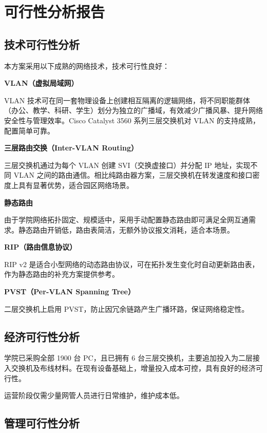 \documentclass[12pt,a4paper]{ctexart}
\begin{document}
\section{可行性分析报告}

\subsection{技术可行性分析}

本方案采用以下成熟的网络技术，技术可行性良好：

\textbf{VLAN（虚拟局域网）}

VLAN 技术可在同一套物理设备上创建相互隔离的逻辑网络，将不同职能群体（办公、教学、科研、学生）划分为独立的广播域，有效减少广播风暴、提升网络安全性与管理效率。Cisco Catalyst 3560 系列三层交换机对 VLAN 的支持成熟，配置简单可靠。

\textbf{三层路由交换（Inter-VLAN Routing）}

三层交换机通过为每个 VLAN 创建 SVI（交换虚接口）并分配 IP 地址，实现不同 VLAN 之间的路由通信。相比纯路由器方案，三层交换机在转发速度和接口密度上具有显著优势，适合园区网络场景。

\textbf{静态路由}

由于学院网络拓扑固定、规模适中，采用手动配置静态路由即可满足全网互通需求。静态路由开销低，路由表简洁，无额外协议报文消耗，适合本场景。

\textbf{RIP（路由信息协议）}

RIP v2 是适合小型网络的动态路由协议，可在拓扑发生变化时自动更新路由表，作为静态路由的补充方案提供参考。

\textbf{PVST（Per-VLAN Spanning Tree）}

二层交换机上启用 PVST，防止因冗余链路产生广播环路，保证网络稳定性。

\subsection{经济可行性分析}

学院已采购全部 1900 台 PC，且已拥有 6 台三层交换机，主要追加投入为二层接入交换机及布线材料。在现有设备基础上，增量投入成本可控，具有良好的经济可行性。

运营阶段仅需少量网管人员进行日常维护，维护成本低。

\subsection{管理可行性分析}
\end{document}
